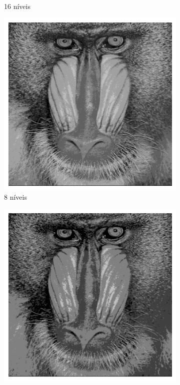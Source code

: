 \documentclass[12pt,a4paper]{report}
\begin{document}
\begin{figure}[H]
\begin{subfigure}{0.3\textwidth}
    \caption{16 níveis}
  \end{subfigure}
  \begin{subfigure}{0.3\textwidth}
    \includegraphics[width=\linewidth]{imagens/ex9-5.png}
    \caption{8 níveis}
  \end{subfigure}
  \begin{subfigure}{0.3\textwidth}
    \includegraphics[width=\linewidth]{imagens/ex9-6.png}

\end{subfigure}
\end{figure}
\end{document}
